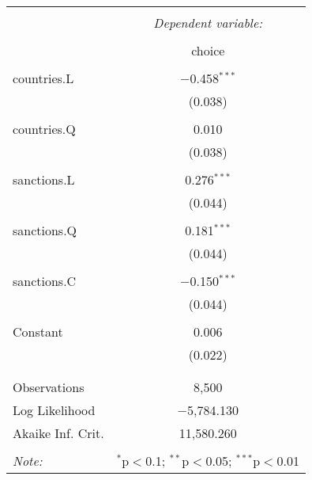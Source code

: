 
\begin{table}[!htbp] \centering 
  \caption{} 
  \label{tab:glm} 
\begin{tabular}{@{\extracolsep{5pt}}lc} 
\\[-1.8ex]\hline 
\hline \\[-1.8ex] 
 & \multicolumn{1}{c}{\textit{Dependent variable:}} \\ 
\cline{2-2} 
\\[-1.8ex] & choice \\ 
\hline \\[-1.8ex] 
 countries.L & $-$0.458$^{***}$ \\ 
  & (0.038) \\ 
  & \\ 
 countries.Q & 0.010 \\ 
  & (0.038) \\ 
  & \\ 
 sanctions.L & 0.276$^{***}$ \\ 
  & (0.044) \\ 
  & \\ 
 sanctions.Q & 0.181$^{***}$ \\ 
  & (0.044) \\ 
  & \\ 
 sanctions.C & $-$0.150$^{***}$ \\ 
  & (0.044) \\ 
  & \\ 
 Constant & 0.006 \\ 
  & (0.022) \\ 
  & \\ 
\hline \\[-1.8ex] 
Observations & 8,500 \\ 
Log Likelihood & $-$5,784.130 \\ 
Akaike Inf. Crit. & 11,580.260 \\ 
\hline 
\hline \\[-1.8ex] 
\textit{Note:}  & \multicolumn{1}{r}{$^{*}$p$<$0.1; $^{**}$p$<$0.05; $^{***}$p$<$0.01} \\ 
\end{tabular} 
\end{table}  
